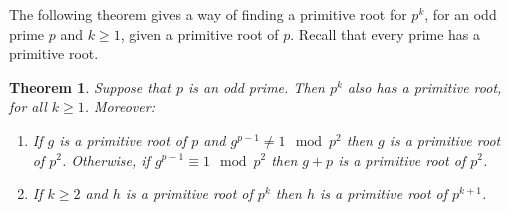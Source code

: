 \documentclass[12pt]{article}
\newtheorem*{thm}{Theorem}
\theoremstyle{definition}
\begin{document}
The following theorem gives a way of finding a primitive root for $p^k$, for an odd prime $p$ and $k\geq 1$, given a primitive root of $p$. Recall that every prime has a primitive root.

\begin{thm}Suppose that $p$ is an odd prime. Then $p^k$ also has a primitive root, for all $k\geq 1$. Moreover:
\begin{enumerate}
\item If $g$ is a primitive root of $p$ and $g^{p-1}\neq 1 \mod p^2$ then $g$ is a primitive root of $p^2$. Otherwise, if $g^{p-1}\equiv 1 \mod p^2$ then $g+p$ is a primitive root of $p^2$.

\item If $k\geq 2$ and $h$ is a primitive root of $p^k$ then $h$ is a primitive root of $p^{k+1}$.
\end{enumerate}
\end{thm}
\end{document}
